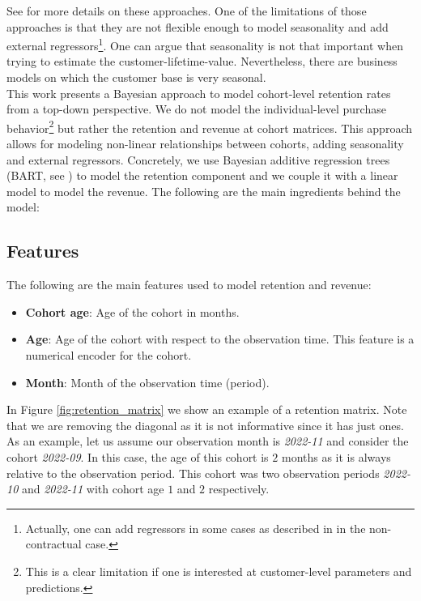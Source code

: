 \documentclass[11pt]{amsart}
\theoremstyle{definition}
\begin{document}
See \cite{FaderHardieNote2017} for more details on these approaches. One of the
limitations of those approaches is that they are not flexible enough to model
seasonality and add external regressors\footnote{Actually, one can add regressors in
some cases as described in \cite{FaderHardieNote2007} in the non-contractual case.}.
One can argue that seasonality is not that important when trying to estimate the
customer-lifetime-value. Nevertheless, there are business models on which the
customer base is very seasonal. \\

This work presents a Bayesian approach to model cohort-level retention rates from
a top-down perspective. We do not model the individual-level purchase
behavior\footnote{This is a clear limitation if one is interested at customer-level
parameters and predictions.} but rather the retention and revenue at cohort matrices.
This approach allows for modeling non-linear relationships between cohorts, adding
seasonality and external regressors. Concretely, we use Bayesian additive regression
trees (BART, see \cite{quiroga2022bart}) to model the retention component and we couple
it with a linear model to model the revenue. The following are the main ingredients 
behind the model:


\subsection*{Features}
The following are the main features used to model retention and revenue:
\begin{itemize}
    \item {\bf Cohort age}: Age of the cohort in months.
    \item {\bf Age}: Age of the cohort with respect to the observation time.
        This feature is a numerical encoder for the cohort.
    \item {\bf Month}: Month of the observation time (period).
\end{itemize}

In Figure \ref{fig:retention_matrix} we show an example of a retention matrix. Note
that we are removing the diagonal as it is not informative since it has just ones. As
an example, let us assume our observation month is {\em 2022-11} and consider the cohort
{\em 2022-09}. In this case, the age of this cohort is $2$ months as it is always
relative to the observation period. This cohort was two observation periods
{\em 2022-10} and {\em 2022-11} with cohort age $1$ and $2$ respectively.\\
\end{document}
